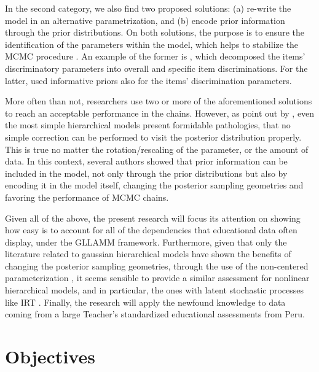 In the second category, we also find two proposed solutions: (a) re-write the model in an alternative parametrization, and (b) encode prior information through the prior distributions. On both solutions, the purpose is to ensure the identification of the parameters within the model, which helps to stabilize the MCMC procedure \cite{Gelman_et_al_2014}. An example of the former is \citet{Fujimoto_2018a}, which decomposed the items' discriminatory parameters into overall and specific item discriminations. For the latter, \citet{Fujimoto_2020} used informative priors also for the items' discrimination parameters.

More often than not, researchers use two or more of the aforementioned solutions to reach an acceptable performance in the chains. However, as point out by \citet{Betancourt_et_al_2013}, even the most simple hierarchical models present formidable pathologies, that no simple correction can be performed to visit the posterior distribution properly. This is true no matter the rotation/rescaling of the parameter, or the amount of data. In this context, several authors \cite{Gelfand_et_al_1995, Gelfand_et_al_1996, Papaspiliopoulos_et_al_2003, Papaspiliopoulos_et_al_2007, Betancourt_et_al_2013} showed that prior information can be included in the model, not only through the prior distributions but also by encoding it in the model itself, changing the posterior sampling geometries and favoring the performance of MCMC chains.

Given all of the above, the present research will focus its attention on showing how easy is to account for all of the dependencies that educational data often display, under the GLLAMM framework. Furthermore,  given that only the literature related to gaussian hierarchical models have shown the benefits of changing the posterior sampling geometries, through the use of the non-centered parameterization \cite{Gelfand_et_al_1995, Gelfand_et_al_1996, Papaspiliopoulos_et_al_2003, Papaspiliopoulos_et_al_2007, Betancourt_et_al_2013}, it seems sensible to provide a similar assessment for nonlinear hierarchical models, and in particular, the ones with latent stochastic processes like IRT \cite{Papaspiliopoulos_et_al_2007}. Finally, the research will apply the newfound knowledge to data coming from a large Teacher's standardized educational assessments from Peru.




\section{Objectives}

